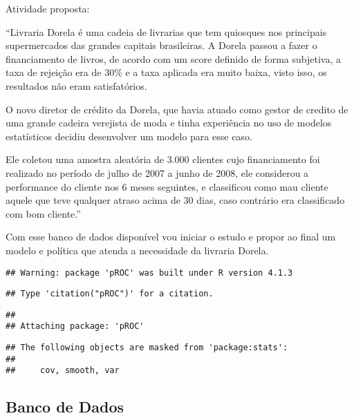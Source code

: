 \documentclass[
]{book}
\begin{document}
Atividade proposta:

``Livraria Dorela é uma cadeia de livrarias que tem quiosques nos principais supermercados das grandes capitais brasileiras. A Dorela passou a fazer o financiamento de livros, de acordo com um score definido de forma subjetiva, a taxa de rejeição era de 30\% e a taxa aplicada era muito baixa, visto isso, os resultados não eram satisfatórios.

O novo diretor de crédito da Dorela, que havia atuado como gestor de credito de uma grande cadeira verejista de moda e tinha experiência no uso de modelos estatísticos decidiu desenvolver um modelo para esse caso.

Ele coletou uma amostra aleatória de 3.000 clientes cujo financiamento foi realizado no período de julho de 2007 a junho de 2008, ele considerou a performance do cliente nos 6 meses seguintes, e classificou como mau cliente aquele que teve qualquer atraso acima de 30 dias, caso contrário era classificado com bom cliente.''

Com esse banco de dados disponível vou iniciar o estudo e propor ao final um modelo e política que atenda a necessidade da livraria Dorela.

\begin{verbatim}
## Warning: package 'pROC' was built under R version 4.1.3
\end{verbatim}

\begin{verbatim}
## Type 'citation("pROC")' for a citation.
\end{verbatim}

\begin{verbatim}
## 
## Attaching package: 'pROC'
\end{verbatim}

\begin{verbatim}
## The following objects are masked from 'package:stats':
## 
##     cov, smooth, var
\end{verbatim}

\hypertarget{banco-de-dados}{%
\subsection{Banco de Dados}\label{banco-de-dados}}
\end{document}
